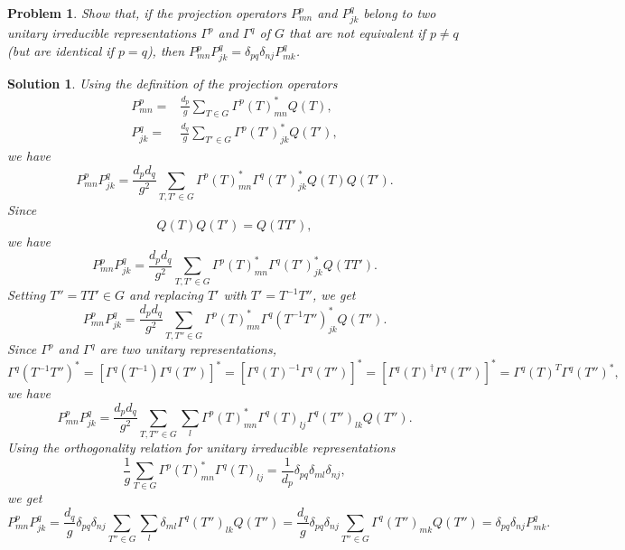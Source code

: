 \documentclass[UTF8,10pt,a4paper]{article}
\theoremstyle{Problem}
\newtheorem{prob}{Problem}
\theoremstyle{Solution}
\newtheorem*{sol}{Solution}
\begin{document}
\begin{prob}
    Show that, if the projection operators $P_{mn}^p$ and $P_{jk}^q$ belong to two unitary irreducible representations $\Gamma^p$ and $\Gamma^q$ of $G$ that are not equivalent if $p\neq q$ (but are identical if $p=q$), then $P_{mn}^pP_{jk}^q=\delta_{pq}\delta_{nj}P_{mk}^q$.
\end{prob}
\begin{sol}
    Using the definition of the projection operators
    \begin{align}
        P_{mn}^p=&\frac{d_p}{g}\sum_{T\in G}\Gamma^p(T)_{mn}^*Q(T),\\
        P_{jk}^q=&\frac{d_q}{g}\sum_{T'\in G}\Gamma^p(T')_{jk}^*Q(T'),
    \end{align}
    we have
    \begin{equation}
        P_{mn}^pP_{jk}^q=\frac{d_pd_q}{g^2}\sum_{T,T'\in G}\Gamma^p(T)_{mn}^*\Gamma^q(T')_{jk}^*Q(T)Q(T').
    \end{equation}
    Since
    \begin{equation}
        Q(T)Q(T')=Q(TT'),
    \end{equation}
    we have
    \begin{equation}
        P_{mn}^pP_{jk}^q=\frac{d_pd_q}{g^2}\sum_{T,T'\in G}\Gamma^p(T)_{mn}^*\Gamma^q(T')_{jk}^*Q(TT').
    \end{equation}
    Setting $T''=TT'\in G$ and replacing $T'$ with $T'=T^{-1}T''$, we get
    \begin{equation}
        P_{mn}^pP_{jk}^q=\frac{d_pd_q}{g^2}\sum_{T,T''\in G}\Gamma^p(T)_{mn}^*\Gamma^q(T^{-1}T'')_{jk}^*Q(T'').
    \end{equation}
    Since $\Gamma^p$ and $\Gamma^q$ are two unitary representations,
    \begin{equation}
        \Gamma^q(T^{-1}T'')^*=[\Gamma^q(T^{-1})\Gamma^q(T'')]^*=[\Gamma^q(T)^{-1}\Gamma^q(T'')]^*=[\Gamma^q(T)^{\dagger}\Gamma^q(T'')]^*=\Gamma^q(T)^T\Gamma^q(T'')^*,
    \end{equation}
    we have
    \begin{equation}
        P_{mn}^pP_{jk}^q=\frac{d_pd_q}{g^2}\sum_{T,T''\in G}\sum_l\Gamma^p(T)_{mn}^*\Gamma^q(T)_{lj}\Gamma^q(T'')_{lk}Q(T'').
    \end{equation}
    Using the orthogonality relation for unitary irreducible representations
    \begin{equation}
        \frac{1}{g}\sum_{T\in G}\Gamma^p(T)_{mn}^*\Gamma^q(T)_{lj}=\frac{1}{d_p}\delta_{pq}\delta_{ml}\delta_{nj},
    \end{equation}
    we get
    \begin{equation}
        P_{mn}^pP_{jk}^q=\frac{d_q}{g}\delta_{pq}\delta_{nj}\sum_{T''\in G}\sum_l\delta_{ml}\Gamma^q(T'')_{lk}Q(T'')=\frac{d_q}{g}\delta_{pq}\delta_{nj}\sum_{T''\in G}\Gamma^q(T'')_{mk}Q(T'')=\delta_{pq}\delta_{nj}P_{mk}^q.
    \end{equation}
\end{sol}
\end{document}
